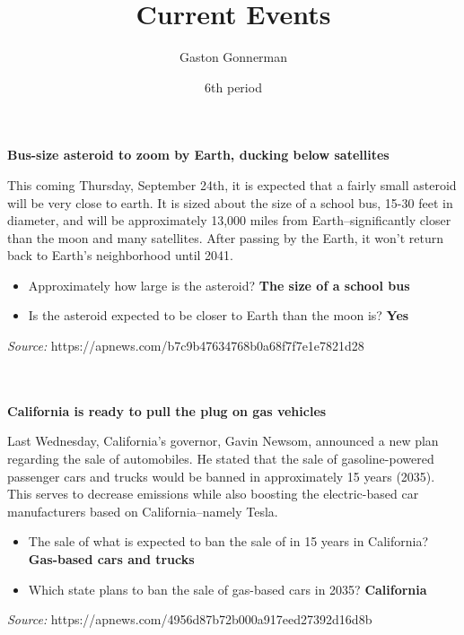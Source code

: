 \documentclass{article}
\title{Current Events}
\author{Gaston Gonnerman}
\date{6th period}
\begin{document}
	\maketitle
	
	\begin{center}
		\large{
			\textbf{Bus-size asteroid to zoom by Earth, ducking below satellites}
		}
	\end{center}
	\par This coming Thursday, September 24th, it is expected that a fairly small asteroid will be very close to earth. It is sized about the size of a school bus, 15-30 feet in diameter, and will be approximately 13,000 miles from Earth--significantly closer than the moon and many satellites. After passing by the Earth, it won't return back to Earth's neighborhood until 2041. 
	
	\begin{itemize}[label=--]
		\item Approximately how large is the asteroid? \textbf{The size of a school bus}
		\item Is the asteroid expected to be closer to Earth than the moon is? \textbf{Yes}
	\end{itemize}

	\noindent
	\emph{Source:} https://apnews.com/b7c9b47634768b0a68f7f7e1e7821d28
	\\ \\ \\
	
	\begin{center}
		\large{
			\textbf{California is ready to pull the plug on gas vehicles}
		}
	\end{center}
	\par Last Wednesday, California's governor, Gavin Newsom, announced a new plan regarding the sale of automobiles. He stated that the sale of gasoline-powered passenger cars and trucks would be banned in approximately 15 years (2035). This serves to decrease emissions while also boosting the electric-based car manufacturers based on California--namely Tesla.
	
	\begin{itemize}[label=--]
		\item The sale of what is expected to ban the sale of in 15 years in California? \textbf{Gas-based cars and trucks}
		\item Which state plans to ban the sale of gas-based cars in 2035? \textbf{California}
	\end{itemize}

	\noindent
	\emph{Source:} https://apnews.com/4956d87b72b000a917eed27392d16d8b
\end{document}
